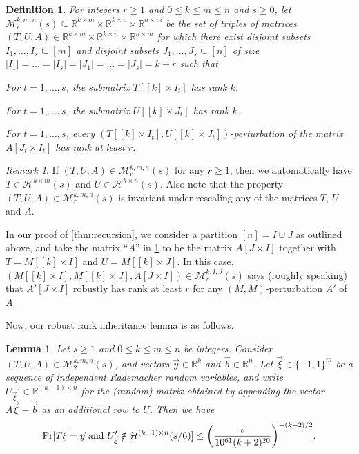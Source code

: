 \documentclass[english]{article}
\newtheorem{lemma}[theorem]{Lemma}
\newtheorem{definition}[theorem]{Definition}
\theoremstyle{remark}
\newtheorem{remark}{Remark}[section]
\numberwithin{equation}{section}
\numberwithin{figure}{section}
\newcommand{\RR}{\mathbb{R}}
\let\originalleft\left
\let\originalright\right
\renewcommand{\left}{\mathopen{}\mathclose\bgroup\originalleft}
\renewcommand{\right}{\aftergroup\egroup\originalright}
\begin{document}
\begin{definition}\label{def:M-definition}
    For integers $r\ge 1$ and $0\le k\le m\le n$ and $s\ge 0$, let $\mathcal{M}_r^{k,m,n}(s)\subseteq\RR^{k\times m}\times\RR^{k\times n}\times\RR^{n\times m}$ be the set of triples of matrices $(T,U,A)\in \RR^{k\times m}\times\RR^{k\times n}\times\RR^{n\times m}$ for which there exist disjoint subsets
$I_{1},\dots,I_{s}\subseteq[m]$ and disjoint subsets $J_{1},\dots,J_{s}\subseteq[n]$ of size $|I_1|=\dots=|I_s|=|J_1|=\dots=|J_s|=k+r$ such that
\begin{compactitem}
    \item[(a)] For $t=1,\dots,s$, the submatrix $T[[k]\times I_t]$ has rank $k$.
    \item[(b)] For $t=1,\dots,s$, the submatrix $U[[k]\times J_t]$ has rank $k$. 
    \item[(c)] For $t=1,\dots,s$, every $(T[[k]\times I_t],U[[k]\times J_t])$-perturbation of the matrix $A[J_t\times I_t]$ has rank at least $r$.
\end{compactitem}
\end{definition}

\begin{remark}\label{rem:M-implies-H}
If $(T,U,A)\in \mathcal{M}_r^{k,m,n}(s)$ for any $r\ge 1$, then we automatically have $T\in \mathcal{H}^{k\times m}(s)$ and $U\in \mathcal{H}^{k\times n}(s)$. Also note that the property $(T,U,A)\in \mathcal{M}_r^{k,m,n}(s)$ is invariant under rescaling any of the matrices $T$, $U$ and $A$.
\end{remark}

In our proof of \cref{thm:recursion}, we consider a partition $[n]=I\cup J$ as outlined above, and take the matrix ``$A$'' in \cref{def:M-definition} to be the matrix $A[J\times I]$ together with $T=M[[k]\times I]$ and $U=M[[k]\times J]$. In this case,  $(M[[k]\times I],M[[k]\times J],A[J\times I])\in \mathcal{M}_r^{k,I,J}(s)$ says (roughly speaking) that $A'[J\times I]$ robustly
has rank at least $r$ for any $(M,M)$-perturbation $A'$ of $A$.

Now, our robust rank inheritance lemma is as follows.

\begin{lemma}\label{key-lemma-corollary}
Let $s\ge 1$ and $0\le k\le m\le n$ be integers. Consider $(T,U,A)\in\mathcal{M}_2^{k,m,n}(s)$, and vectors $\vec{y}\in\RR^{k}$
and $\vec{b}\in\RR^{n}$. Let $\vec{\xi}\in\{-1,1\}^{m}$
be a sequence of independent Rademacher random variables, and write $U_{\vec \xi}'\in \RR^{(k+1)\times n}$ for the (random) matrix obtained by appending the vector $A\vec{\xi}-\vec{b}$ as an additional row to $U$. Then we have
\[
\Pr[T\vec{\xi}=\vec{y}\text{ and }U_{\vec \xi}'\notin \mathcal H^{(k+1)\times n}(s/6)]\le \left(\frac{s}{10^{61}(k+2)^{20}}\right)^{-(k+2)/2}.
\]
\end{lemma}
\end{document}
